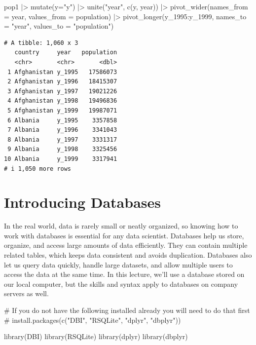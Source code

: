 \documentclass[
  letterpaper,
  DIV=11,
  numbers=noendperiod]{scrreprt}
\newenvironment{Shaded}{\begin{snugshade}}{\end{snugshade}}
\newcommand{\AttributeTok}[1]{\textcolor[rgb]{0.40,0.45,0.13}{#1}}
\newcommand{\CommentTok}[1]{\textcolor[rgb]{0.37,0.37,0.37}{#1}}
\newcommand{\FunctionTok}[1]{\textcolor[rgb]{0.28,0.35,0.67}{#1}}
\newcommand{\NormalTok}[1]{\textcolor[rgb]{0.00,0.23,0.31}{#1}}
\newcommand{\SpecialCharTok}[1]{\textcolor[rgb]{0.37,0.37,0.37}{#1}}
\newcommand{\StringTok}[1]{\textcolor[rgb]{0.13,0.47,0.30}{#1}}
\begin{document}
\begin{Shaded}
\begin{Highlighting}[]
\NormalTok{pop1 }\SpecialCharTok{|\textgreater{}} \FunctionTok{mutate}\NormalTok{(}\AttributeTok{y=}\StringTok{"y"}\NormalTok{) }\SpecialCharTok{|\textgreater{}} \FunctionTok{unite}\NormalTok{(}\StringTok{"year"}\NormalTok{, }\FunctionTok{c}\NormalTok{(y, year)) }\SpecialCharTok{|\textgreater{}}
    \FunctionTok{pivot\_wider}\NormalTok{(}\AttributeTok{names\_from =}\NormalTok{ year, }\AttributeTok{values\_from =}\NormalTok{ population) }\SpecialCharTok{|\textgreater{}}
    \FunctionTok{pivot\_longer}\NormalTok{(y\_1995}\SpecialCharTok{:}\NormalTok{y\_1999, }\AttributeTok{names\_to =} \StringTok{"year"}\NormalTok{, }\AttributeTok{values\_to =} \StringTok{"population"}\NormalTok{)}
\end{Highlighting}
\end{Shaded}

\begin{verbatim}
# A tibble: 1,060 x 3
   country     year   population
   <chr>       <chr>       <dbl>
 1 Afghanistan y_1995   17586073
 2 Afghanistan y_1996   18415307
 3 Afghanistan y_1997   19021226
 4 Afghanistan y_1998   19496836
 5 Afghanistan y_1999   19987071
 6 Albania     y_1995    3357858
 7 Albania     y_1996    3341043
 8 Albania     y_1997    3331317
 9 Albania     y_1998    3325456
10 Albania     y_1999    3317941
# i 1,050 more rows
\end{verbatim}


\chapter{Introducing Databases}\label{introducing-databases}

In the real world, data is rarely small or neatly organized, so knowing
how to work with databases is essential for any data scientist.
Databases help us store, organize, and access large amounts of data
efficiently. They can contain multiple related tables, which keeps data
consistent and avoids duplication. Databases also let us query data
quickly, handle large datasets, and allow multiple users to access the
data at the same time. In this lecture, we'll use a database stored on
our local computer, but the skills and syntax apply to databases on
company servers as well.

\begin{Shaded}
\begin{Highlighting}[]
\CommentTok{\# If you do not have the following installed already you will need to do that first}
\CommentTok{\# install.packages(c("DBI", "RSQLite", "dplyr", "dbplyr"))}

\FunctionTok{library}\NormalTok{(DBI)}
\FunctionTok{library}\NormalTok{(RSQLite)}
\FunctionTok{library}\NormalTok{(dplyr)}
\FunctionTok{library}\NormalTok{(dbplyr)}
\end{Highlighting}
\end{Shaded}
\end{document}
